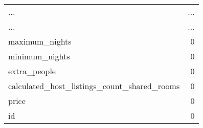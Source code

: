 \begin{tabular}{lr}
... & ...\\
... & ...\\
maximum\_nights                               &      0 \\
minimum\_nights                               &      0 \\
extra\_people                                 &      0 \\
calculated\_host\_listings\_count\_shared\_rooms  &      0 \\
price                                        &      0 \\
id                                           &      0 \\
\bottomrule
\end{tabular}


